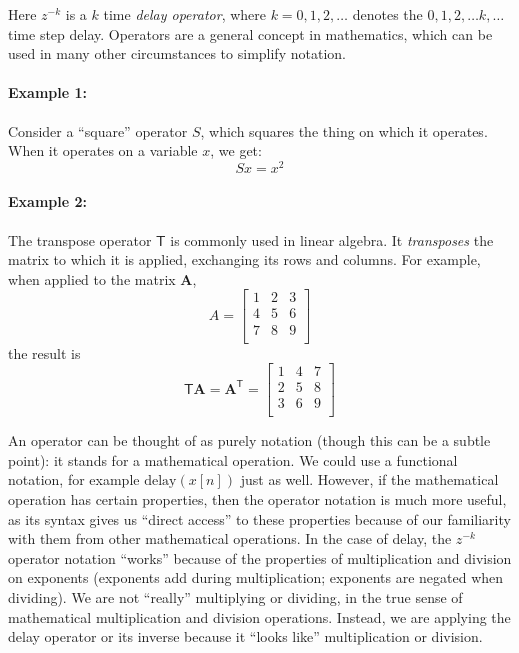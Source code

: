 Here $z^{-k}$ is a $k$ time \emph{delay operator}, where $k=0, 1, 2,
\ldots $ denotes the $0, 1, 2, \ldots k, \ldots$ time step
delay. Operators are a general concept in mathematics, which can be
used in many other circumstances to simplify notation.

\paragraph*{Example 1:}

Consider a ``square'' operator $S$, which squares the thing on which
it operates.  When it operates on a variable $x$, we get:
\begin{equation*}
Sx = x^2
\end{equation*}

\paragraph*{Example 2:}

The transpose operator $\mathsf{T}$ is commonly used in linear
algebra.  It \emph{transposes} the matrix to which it is applied,
exchanging its rows and columns. For example, when applied to the
matrix $\mathbf{A}$,
\begin{equation*}
A=\left[
\begin{array}{ccc}
1 & 2 & 3 \\
4 & 5 & 6 \\
7 & 8 & 9 \\
\end{array}
\right]
\end{equation*}
the result is
\begin{equation*}
\mathsf{T}\mathbf{A} = \mathbf{A}^\mathsf{T} = \left[
\begin{array}{ccc}
1 & 4 & 7 \\
2 & 5 & 8 \\
3 & 6 & 9 \\
\end{array}
\right]
\end{equation*}

An operator can be thought of as purely notation (though this can be a
subtle point): it stands for a mathematical operation. We could use a
functional notation, for example $\mathrm{delay}(x[n])$ just as
well. However, if the mathematical operation has certain properties,
then the operator notation is much more useful, as its syntax gives us
``direct access'' to these properties because of our familiarity with
them from other mathematical operations. In the case of delay, the
$z^{-k}$ operator notation ``works'' because of the properties of
multiplication and division on exponents (exponents
add during multiplication; exponents are negated when dividing). We
are not ``really'' multiplying or dividing, in the true sense of
mathematical multiplication and division operations. 
Instead, we are applying the delay operator or its inverse because it ``looks like''
multiplication or division.

